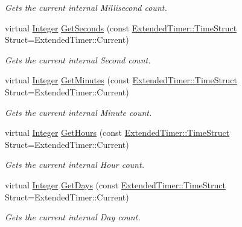 \begin{DoxyCompactItemize}
\begin{DoxyCompactList}\small\item\em Gets the current internal Millisecond count. \item\end{DoxyCompactList}\item 
virtual \hyperlink{namespacephys_a7f09bf5585b2bb97613cd9aad4273a81}{Integer} \hyperlink{classphys_1_1ExtendedTimer_a4b8cd596878863ce9272f0484067c1f3}{GetSeconds} (const \hyperlink{classphys_1_1ExtendedTimer_a0f316e9347d1c118a157cc3c737c554b}{ExtendedTimer::TimeStruct} Struct=ExtendedTimer::Current)
\begin{DoxyCompactList}\small\item\em Gets the current internal Second count. \item\end{DoxyCompactList}\item 
virtual \hyperlink{namespacephys_a7f09bf5585b2bb97613cd9aad4273a81}{Integer} \hyperlink{classphys_1_1ExtendedTimer_a4081b9972f76c424b4ca067c8358a926}{GetMinutes} (const \hyperlink{classphys_1_1ExtendedTimer_a0f316e9347d1c118a157cc3c737c554b}{ExtendedTimer::TimeStruct} Struct=ExtendedTimer::Current)
\begin{DoxyCompactList}\small\item\em Gets the current internal Minute count. \item\end{DoxyCompactList}\item 
virtual \hyperlink{namespacephys_a7f09bf5585b2bb97613cd9aad4273a81}{Integer} \hyperlink{classphys_1_1ExtendedTimer_af5cada222452ad347062efa9eb6f365a}{GetHours} (const \hyperlink{classphys_1_1ExtendedTimer_a0f316e9347d1c118a157cc3c737c554b}{ExtendedTimer::TimeStruct} Struct=ExtendedTimer::Current)
\begin{DoxyCompactList}\small\item\em Gets the current internal Hour count. \item\end{DoxyCompactList}\item 
virtual \hyperlink{namespacephys_a7f09bf5585b2bb97613cd9aad4273a81}{Integer} \hyperlink{classphys_1_1ExtendedTimer_ac3fe4d0a31999d8f6e3a900f8aaa6816}{GetDays} (const \hyperlink{classphys_1_1ExtendedTimer_a0f316e9347d1c118a157cc3c737c554b}{ExtendedTimer::TimeStruct} Struct=ExtendedTimer::Current)
\begin{DoxyCompactList}\small\item\em Gets the current internal Day count. \item\end{DoxyCompactList}\end{DoxyCompactItemize}
